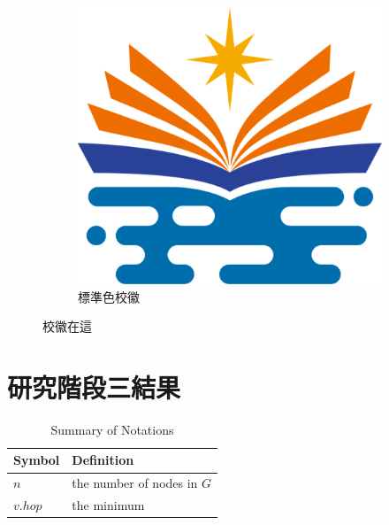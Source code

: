 \begin{figure}
\begin{subfigure}{0.4\textwidth}
        \includegraphics[width=\textwidth]{./figures/seal/seal_standard.png}
        \caption{標準色校徽}
    \end{subfigure}
    \caption{校徽在這}
\end{figure}

\section{研究階段三結果}

\begin{table} [!h]
    \centering
    \centering \caption{Summary of Notations}
    \begin{tabular}{|p{1.5cm}|p{6.5cm}|} \hline
        Symbol  & Definition
        \\ \hline
        $n$     & the number of nodes in $G$
        \\ \hline
        $v.hop$ & the minimum
        \\ \hline
    \end{tabular}\label{table:notation}

\end{table}